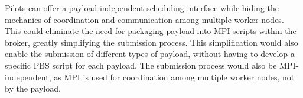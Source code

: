 

Pilots can offer a payload-independent scheduling interface while hiding the
mechanics of coordination and communication among multiple worker nodes. This
could eliminate the need for packaging payload into MPI scripts within the
broker, greatly simplifying the submission process. This simplification would
also enable the submission of different types of payload, without having to
develop a specific PBS script for each payload. The submission process would
also be MPI-independent, as MPI is used for coordination among multiple worker
nodes, not by the payload.



